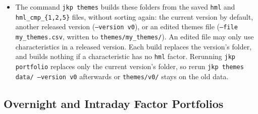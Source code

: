 \documentclass[12pt,title,fleqn]{article}
\begin{document}
\begin{itemize}
  \item The command \texttt{jkp themes} builds these folders from the saved \texttt{hml} and \texttt{hml\_cmp\_\{1,2,5\}} files, without sorting again: the current version by default, another released version (\texttt{--version v0}), or an edited themes file (\texttt{--file my\_themes.csv}, written to \texttt{themes/my\_themes/}). An edited file may only use characteristics in a released version. Each build replaces the version's folder, and builds nothing if a characteristic has no \texttt{hml} factor. Rerunning \texttt{jkp portfolio} replaces only the current version's folder, so rerun \texttt{jkp themes data/ --version v0} afterwards or \texttt{themes/v0/} stays on the old data.
\end{itemize}

\subsection{Overnight and Intraday Factor Portfolios}\label{sec:oi-portfolios}
\end{document}
